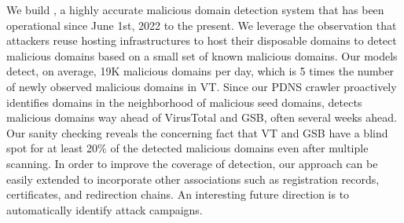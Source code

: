 We build \system, a highly accurate malicious domain detection system that has been operational since June 1st, 2022 to the present. We leverage the observation that attackers reuse hosting infrastructures to host their disposable domains to detect malicious domains based on a small set of known malicious domains. Our models detect, on average, 19K malicious domains per day, which is 5 times the number of newly observed malicious domains in VT. Since our PDNS crawler proactively identifies domains in the neighborhood of malicious seed domains, \system detects malicious domains way ahead of VirusTotal and GSB, often several weeks ahead. Our sanity checking reveals the concerning fact that VT and GSB have a blind spot for at least 20\% of the detected malicious domains even after multiple scanning. In order to improve the coverage of detection, our approach can be easily extended to incorporate other associations such as registration records, certificates, and redirection chains. An interesting future direction is to automatically identify attack campaigns.